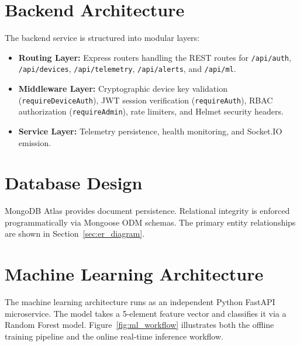 \section{Backend Architecture}
The backend service is structured into modular layers:
\begin{itemize}
    \item \textbf{Routing Layer:} Express routers handling the REST routes for \texttt{/api/auth}, \texttt{/api/devices}, \texttt{/api/telemetry}, \texttt{/api/alerts}, and \texttt{/api/ml}.
    \item \textbf{Middleware Layer:} Cryptographic device key validation (\texttt{requireDeviceAuth}), JWT session verification (\texttt{requireAuth}), RBAC authorization (\texttt{requireAdmin}), rate limiters, and Helmet security headers.
    \item \textbf{Service Layer:} Telemetry persistence, health monitoring, and Socket.IO emission.
\end{itemize}

\section{Database Design}
MongoDB Atlas provides document persistence. Relational integrity is enforced programmatically via Mongoose ODM schemas. The primary entity relationships are shown in Section~\ref{sec:er_diagram}.

\section{Machine Learning Architecture}
The machine learning architecture runs as an independent Python FastAPI microservice. The model takes a 5-element feature vector and classifies it via a Random Forest model. Figure~\ref{fig:ml_workflow} illustrates both the offline training pipeline and the online real-time inference workflow.

